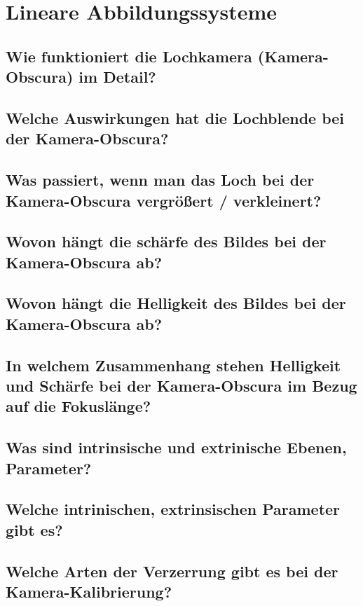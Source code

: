 \section{Lineare Abbildungssysteme}

\subsection{Wie funktioniert die Lochkamera (Kamera-Obscura) im Detail?}

\subsection{Welche Auswirkungen hat die Lochblende bei der Kamera-Obscura?}

\subsection{Was passiert, wenn man das Loch bei der Kamera-Obscura vergrößert / verkleinert?}

\subsection{Wovon hängt die schärfe des Bildes bei der Kamera-Obscura ab?}

\subsection{Wovon hängt die Helligkeit des Bildes bei der Kamera-Obscura ab?}

\subsection{In welchem Zusammenhang stehen Helligkeit und Schärfe bei der Kamera-Obscura im Bezug auf die Fokuslänge?}

\subsection{Was sind intrinsische und extrinische Ebenen, Parameter?}

\subsection{Welche intrinischen, extrinsischen Parameter gibt es?}

\subsection{Welche Arten der Verzerrung gibt es bei der Kamera-Kalibrierung?}

